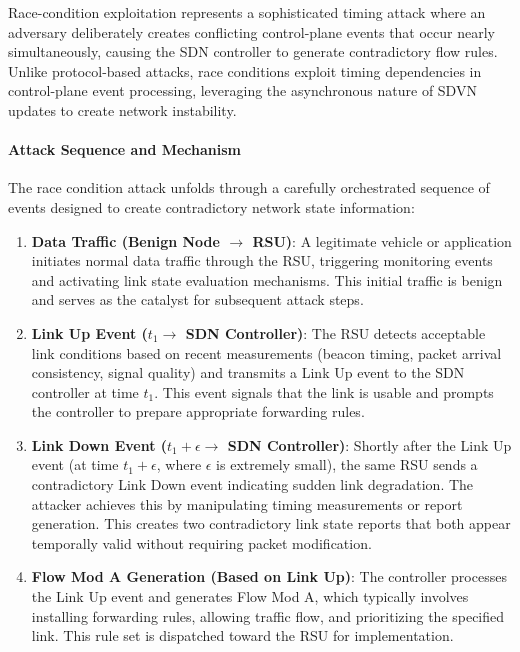 Race-condition exploitation represents a sophisticated timing attack where an adversary deliberately creates conflicting control-plane events that occur nearly simultaneously, causing the SDN controller to generate contradictory flow rules. Unlike protocol-based attacks, race conditions exploit timing dependencies in control-plane event processing, leveraging the asynchronous nature of SDVN updates to create network instability.

\paragraph{Attack Sequence and Mechanism}
The race condition attack unfolds through a carefully orchestrated sequence of events designed to create contradictory network state information:

\begin{enumerate}
    \item \textbf{Data Traffic (Benign Node $\rightarrow$ RSU)}: A legitimate vehicle or application initiates normal data traffic through the RSU, triggering monitoring events and activating link state evaluation mechanisms. This initial traffic is benign and serves as the catalyst for subsequent attack steps.
    
    \item \textbf{Link Up Event ($t_1 \rightarrow$ SDN Controller)}: The RSU detects acceptable link conditions based on recent measurements (beacon timing, packet arrival consistency, signal quality) and transmits a Link Up event to the SDN controller at time $t_1$. This event signals that the link is usable and prompts the controller to prepare appropriate forwarding rules.
    
    \item \textbf{Link Down Event ($t_1 + \epsilon \rightarrow$ SDN Controller)}: Shortly after the Link Up event (at time $t_1 + \epsilon$, where $\epsilon$ is extremely small), the same RSU sends a contradictory Link Down event indicating sudden link degradation. The attacker achieves this by manipulating timing measurements or report generation. This creates two contradictory link state reports that both appear temporally valid without requiring packet modification.
    
    \item \textbf{Flow Mod A Generation (Based on Link Up)}: The controller processes the Link Up event and generates Flow Mod A, which typically involves installing forwarding rules, allowing traffic flow, and prioritizing the specified link. This rule set is dispatched toward the RSU for implementation.
    

\end{enumerate}

